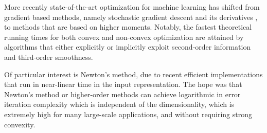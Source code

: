 \documentclass[final,12pt]{colt2018} %
\begin{document}
More recently state-of-the-art optimization for machine learning has shifted from gradient based methods, namely stochastic gradient descent and its derivatives  \citep{adagrad,svrg}, to methods that are based on higher moments.  Notably, the fastest theoretical running times for both convex \citep{LiSSA2016,xu2016sub,bollapragada2016exact} and non-convex \citep{Agarwal:2017:FAL:3055399.3055464,CarmonAGD} optimization are attained by algorithms that either explicitly or implicitly exploit second-order information and third-order smoothness. 

Of particular interest is Newton's method, due to recent efficient implementations that run in near-linear time in the input representation. The hope was that Newton's method or higher-order methods can achieve logarithmic in error iteration complexity which is independent of the dimensionality, which is  extremely high for many large-scale applications, and without requiring strong convexity.  %
\end{document}
